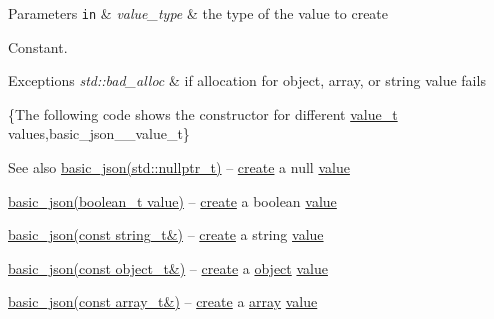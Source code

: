 \begin{DoxyParams}[1]{Parameters}
\mbox{\tt in}  & {\em value\+\_\+type} & the type of the value to create\\
\hline
\end{DoxyParams}
Constant.


\begin{DoxyExceptions}{Exceptions}
{\em std\+::bad\+\_\+alloc} & if allocation for object, array, or string value fails\\
\hline
\end{DoxyExceptions}
\{The following code shows the constructor for different \hyperlink{classnlohmann_1_1basic__json_a231b02148577b69a154b2ce2c87a5522}{value\+\_\+t} values,basic\+\_\+json\+\_\+\+\_\+value\+\_\+t\}

\begin{DoxySeeAlso}{See also}
\hyperlink{classnlohmann_1_1basic__json_aa7ad0ebda83e54c22ba8b3d954ef1293}{basic\+\_\+json(std\+::nullptr\+\_\+t)} -- \hyperlink{classnlohmann_1_1basic__json_afdb7a485369fbfd8c4c7c134ebb1feb5}{create} a {\ttfamily null} \hyperlink{classnlohmann_1_1basic__json_a407e73a037e6e3067ef7aa2c25a79f39}{value} 

\hyperlink{classnlohmann_1_1basic__json_aac36af84d907b5c3e469af889661620a}{basic\+\_\+json(boolean\+\_\+t value)} -- \hyperlink{classnlohmann_1_1basic__json_afdb7a485369fbfd8c4c7c134ebb1feb5}{create} a boolean \hyperlink{classnlohmann_1_1basic__json_a407e73a037e6e3067ef7aa2c25a79f39}{value} 

\hyperlink{classnlohmann_1_1basic__json_ab8b43d92a042dde96c28aeea81dd52de}{basic\+\_\+json(const string\+\_\+t\&)} -- \hyperlink{classnlohmann_1_1basic__json_afdb7a485369fbfd8c4c7c134ebb1feb5}{create} a string \hyperlink{classnlohmann_1_1basic__json_a407e73a037e6e3067ef7aa2c25a79f39}{value} 

\hyperlink{classnlohmann_1_1basic__json_a9af5ea68c88f423ddf35216aff7f1813}{basic\+\_\+json(const object\+\_\+t\&)} -- \hyperlink{classnlohmann_1_1basic__json_afdb7a485369fbfd8c4c7c134ebb1feb5}{create} a \hyperlink{classnlohmann_1_1basic__json_ad25b2f8c21e241e2d63455537a9294ff}{object} \hyperlink{classnlohmann_1_1basic__json_a407e73a037e6e3067ef7aa2c25a79f39}{value} 

\hyperlink{classnlohmann_1_1basic__json_a3aaf41d385f0d9a93deb92f9b14ae0cf}{basic\+\_\+json(const array\+\_\+t\&)} -- \hyperlink{classnlohmann_1_1basic__json_afdb7a485369fbfd8c4c7c134ebb1feb5}{create} a \hyperlink{classnlohmann_1_1basic__json_a5685815624b086caa532f41e853d4b0f}{array} \hyperlink{classnlohmann_1_1basic__json_a407e73a037e6e3067ef7aa2c25a79f39}{value} 


\end{DoxySeeAlso}
